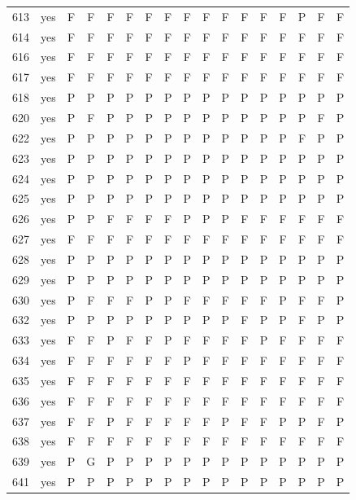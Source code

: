 \begin{table}[p]
\begin{tabular*}{\textwidth}{@{\extracolsep{\fill}}rcccccccccccccccc}
613 & yes & F & F & F & F & F & F & F & F & F & F & F & F & P & F & F\\
614 & yes & F & F & F & F & F & F & F & F & F & F & F & F & F & F & F\\
616 & yes & F & F & F & F & F & F & F & F & F & F & F & F & F & F & F\\
617 & yes & F & F & F & F & F & F & F & F & F & F & F & F & F & F & F\\
618 & yes & P & P & P & P & P & P & P & P & P & P & P & P & P & P & P\\
620 & yes & P & F & P & P & P & P & P & P & P & P & P & P & P & F & P\\
622 & yes & P & P & P & P & P & P & P & P & P & P & P & P & F & P & P\\
623 & yes & P & P & P & P & P & P & P & P & P & P & P & P & P & P & P\\
624 & yes & P & P & P & P & P & P & P & P & P & P & P & P & P & P & P\\
625 & yes & P & P & P & P & P & P & P & P & P & P & P & P & P & P & P\\
626 & yes & P & P & F & F & F & F & P & P & P & F & F & F & F & F & F\\
627 & yes & F & F & F & F & F & F & F & F & F & F & F & F & F & F & F\\
628 & yes & P & P & P & P & P & P & P & P & P & P & P & P & P & P & P\\
629 & yes & P & P & P & P & P & P & P & P & P & P & P & P & P & P & P\\
630 & yes & P & F & F & F & P & P & F & F & F & F & F & P & F & F & P\\
632 & yes & P & P & P & P & P & P & P & P & P & F & P & P & F & P & P\\
633 & yes & F & F & P & F & F & P & F & F & F & F & P & F & F & F & F\\
634 & yes & F & F & F & F & F & F & P & F & F & F & F & F & F & F & F\\
635 & yes & F & F & F & F & F & F & F & F & F & F & F & F & F & F & F\\
636 & yes & F & F & F & F & F & F & F & F & F & F & F & F & F & F & F\\
637 & yes & F & F & P & F & F & F & F & F & P & F & F & P & P & F & P\\
638 & yes & F & F & F & F & F & F & F & F & F & F & F & F & F & F & F\\
639 & yes & P & G & P & P & P & P & P & P & P & P & P & P & P & P & P\\
641 & yes & P & P & P & P & P & P & P & P & P & P & P & P & P & P & P\\
\bottomrule\end{tabular*}\end{table}
\clearpage


